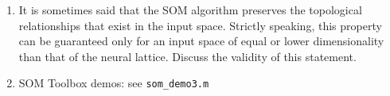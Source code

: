 \documentclass[10pt]{article}
\begin{document}
\begin{enumerate}
\vspace{2mm}

\item It is sometimes said that the SOM algorithm preserves the topological relationships that exist in
the input space. Strictly speaking, this property can be guaranteed only for an input space of
equal or lower dimensionality than that of the neural lattice. Discuss the validity of this statement.

\vspace{2mm}

\item SOM Toolbox demos: see {\tt som\_demo3.m}

\end{enumerate}
\end{document}
